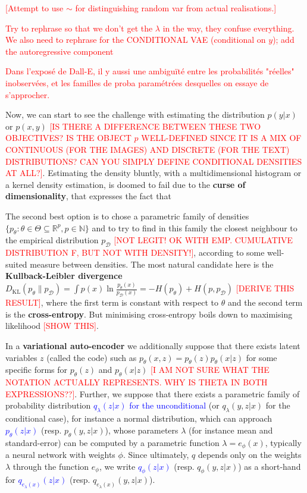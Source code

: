 \documentclass{article}
\begin{document}
\begin{appendix}
\textcolor{red}{[Attempt to use $\sim$ for distinguishing random var from actual realisations.]} 


\textcolor{red}{Try to rephrase so that we don't get the $\lambda$ in the way, they confuse everything. We also need to rephrase for the CONDITIONAL VAE (conditional on $y$); add the autoregressive component}

\textcolor{red}{Dans l'exposé de Dall-E, il y aussi une ambiguïté entre les probabilités "réelles" inobservées, et les familles de proba paramétrées desquelles on essaye de s'approcher.}



Now, we can start to see the challenge with estimating the distribution $p(y|x)$ or $p(x,y)$ \textcolor{red}{[IS THERE A DIFFERENCE BETWEEN THESE TWO OBJECTIVES? IS THE OBJECT $p$ WELL-DEFINED SINCE IT IS A MIX OF CONTINUOUS (FOR THE IMAGES) AND DISCRETE (FOR THE TEXT) DISTRIBUTIONS? CAN YOU SIMPLY DEFINE CONDITIONAL DENSITIES AT ALL?]}. Estimating the density bluntly, with a multidimensional histogram or a kernel density estimation, is doomed to fail due to the \textbf{curse of dimensionality}, that expresses the fact that 

The second best option is to chose a parametric family of densities $\{p_\theta{}:\theta \in \Theta \subseteq \mathbb{R}^p, p\in\mathbb{N}\}$ and to try to find in this family the closest neighbour to the empirical distribution $p_{\mathcal{D}}$ \textcolor{red}{[NOT LEGIT! OK WITH EMP. CUMULATIVE DISTRIBUTION F, BUT NOT WITH DENSITY!]}, according to some well-suited measure between densities.
The most natural candidate here is the \textbf{Kullback-Leibler divergence} $D_{\operatorname{KL}}(p_\theta\|p_\mathcal{D})=\int p(x) \ln \frac{p_\theta(x)}{p_\mathcal{D}(x)}=-H(p_\theta)+H(p,p_\mathcal{D})$ \textcolor{red}{[DERIVE THIS RESULT]}, where the first term is constant with respect to $\theta$ and the second term is the \textbf{cross-entropy}.
But minimising cross-entropy boils down to maximising likelihood \textcolor{red}{[SHOW THIS]}.

In a \textbf{variational auto-encoder} we additionally suppose that there exists latent variables $z$ (called the code) such as  $p_{\theta}(x,z)=p_\theta(z)p_\theta(x|z)$ for some specific forms for $p_\theta(z)$ and $p_\theta(x|z)$ \textcolor{red}{[I AM NOT SURE WHAT THE NOTATION ACTUALLY REPRESENTS. WHY IS THETA IN BOTH EXPRESSIONS??]}.
Further, we suppose that there exists a parametric family of probability distribution \textcolor{blue}{$q_\lambda(z|x)$ for the unconditional} (or $q_\lambda(y,z|x)$ for the conditional case), for instance a normal distribution, which can approach \textcolor{blue}{$p_\theta(z|x)$} (resp. $p_\theta(y,z|x)$), whose parameters $\lambda$ (for instance mean and standard-error) can be computed by a parametric function $\lambda=e_\phi(x)$, typically a neural network with weights $\phi$.
Since ultimately, $q$ depends only on the weights $\lambda$ through the function $e_\phi$, we write \textcolor{blue}{$q_\phi(z|x)$} (resp. $q_\phi(y,z|x)$)  as a short-hand for \textcolor{blue}{$q_{e_\lambda(x)}(z|x)$} (resp. $q_{e_\lambda(x)}(y,z|x)$).


\end{appendix}
\end{document}
